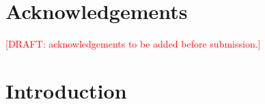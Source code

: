 \documentclass[12pt,a4paper,oneside]{report}
\newcommand{\rev}[1]{#1}
\newenvironment{revisionblock}{}{}
\begin{document}
\chapter*{\rev{Acknowledgements}}
\begin{revisionblock}
\textcolor{red}{[DRAFT: acknowledgements to be added before submission.]}
\end{revisionblock}

\tableofcontents
\clearpage


\chapter[Introduction]{\rev{Introduction}}
\label{chap:introduction}
\end{document}
